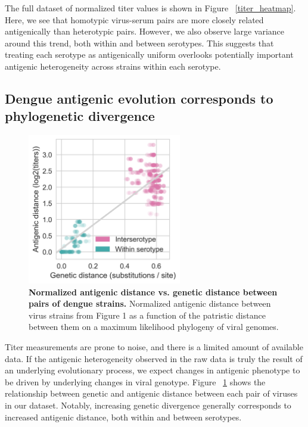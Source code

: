 \documentclass[11pt,oneside,letterpaper]{article}
\begin{document}
The full dataset of normalized titer values is shown in Figure ~\ref{titer_heatmap}.
Here, we see that homotypic virus-serum pairs are more closely related antigenically than heterotypic pairs.
However, we also observe large variance around this trend, both within and between serotypes.
This suggests that treating each serotype as antigenically uniform overlooks potentially important antigenic heterogeneity across strains within each serotype.

\subsection{Dengue antigenic evolution corresponds to phylogenetic divergence}

\begin{figure}[h]
  \begin{centering}
  \includegraphics[width=0.6\textwidth]{../figures/png/genetic_antigenic_distance.png}
  	\caption{\textbf{Normalized antigenic distance vs. genetic distance between pairs of dengue strains.} \linebreak Normalized antigenic distance between virus strains from Figure 1 as a function of the patristic distance between them on a maximum likelihood phylogeny of viral genomes.}
  	\label{genetic_antigenic_distance}
  \end{centering}
\end{figure}

Titer measurements are prone to noise, and there is a limited amount of available data.
If the antigenic heterogeneity observed in the raw data is truly the result of an underlying evolutionary process, we expect changes in antigenic phenotype to be driven by underlying changes in viral genotype.
Figure ~\ref{genetic_antigenic_distance} shows the relationship between genetic and antigenic distance between each pair of viruses in our dataset.
Notably, increasing genetic divergence generally corresponds to increased antigenic distance, both within and between serotypes.
\end{document}
